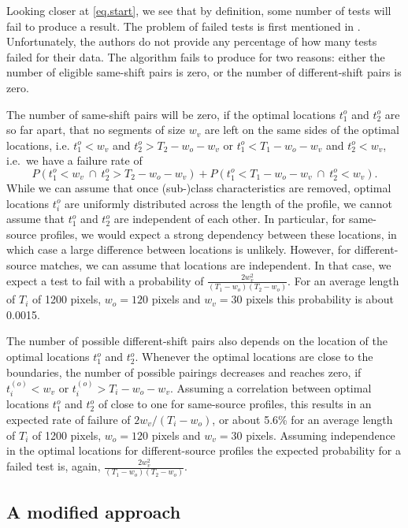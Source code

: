 \documentclass[12pt]{article}
\begin{document}
Looking closer at \autoref{eq.start}, we see that by definition, some
number of tests will fail to produce a result. The problem of failed
tests is first mentioned in \citet{afte-chumbley}. Unfortunately, the
authors do not provide any percentage of how many tests failed for their
data. The algorithm fails to produce for two reasons: either the number
of eligible same-shift pairs is zero, or the number of different-shift
pairs is zero.

The number of same-shift pairs will be zero, if the optimal locations
\(t_1^{o}\) and \(t_2^{o}\) are so far apart, that no segments of size
\(w_v\) are left on the same sides of the optimal locations, i.e.
\(t_1^{o} < w_v\) and \(t_2^{o} > T_2-w_o-w_v\) or
\(t_1^{o} < T_1- w_o - w_v\) and \(t_2^{o} < w_v\), i.e.~we have a
failure rate of \[
P\left( t_1^{o} < w_v \ \cap \ t_2^{o} > T_2-w_o-w_v\right) + P\left( t_1^{o} < T_1- w_o - w_v \ \cap \ t_2^{o} < w_v\right).
\] While we can assume that once (sub-)class characteristics are
removed, optimal locations \(t_i^{o}\) are uniformly distributed across
the length of the profile, we cannot assume that \(t_1^o\) and \(t_2^o\)
are independent of each other. In particular, for same-source profiles,
we would expect a strong dependency between these locations, in which
case a large difference between locations is unlikely. However, for
different-source matches, we can assume that locations are independent.
In that case, we expect a test to fail with a probability of
\(\frac{2 w_v^2}{(T_1-w_o)(T_2-w_o)}\). For an average length of \(T_i\)
of 1200 pixels, \(w_o = 120\) pixels and \(w_v = 30\) pixels this
probability is about 0.0015.

The number of possible different-shift pairs also depends on the
location of the optimal locations \(t_1^o\) and \(t_2^o\). Whenever the
optimal locations are close to the boundaries, the number of possible
pairings decreases and reaches zero, if \(t_i^{(o)} < w_v\) or
\(t_i^{(o)} > T_i-w_o- w_v\). Assuming a correlation between optimal
locations \(t_1^o\) and \(t_2^o\) of close to one for same-source
profiles, this results in an expected rate of failure of
\(2 w_v / (T_i-w_o)\), or about 5.6\% for an average length of \(T_i\)
of 1200 pixels, \(w_o = 120\) pixels and \(w_v = 30\) pixels. Assuming
independence in the optimal locations for different-source profiles the
expected probability for a failed test is, again,
\(\frac{2 w_v^2}{(T_1-w_o)(T_2-w_o)}\).

\hypertarget{a-modified-approach}{%
\subsection{A modified approach}\label{a-modified-approach}}
\end{document}
